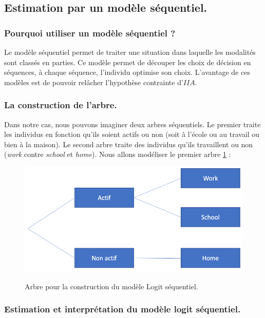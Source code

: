 \subsection{Estimation par un modèle séquentiel.}

\subsubsection*{Pourquoi utiliser un modèle séquentiel ?}

Le modèle séquentiel permet de traiter une situation dans laquelle les modalités sont classés en parties. Ce modèle permet de découper les choix de décision en séquences, à chaque séquence, l’individu optimise son choix. L’avantage de ces modèles est de pouvoir relâcher l’hypothèse contrainte d’$IIA$. 


\subsubsection*{La construction de l'arbre.}

Dans notre cas, nous pouvons imaginer deux arbres séquentiels. Le premier traite les individus en fonction qu’ils soient actifs ou non (soit à l’école ou au travail ou bien à la maison). Le second arbre traite des individus qu’ils travaillent ou non (\emph{work} contre \emph{school} et \emph{home}). Nous allons modéliser le premier arbre \ref{fig:arbre} : 


\begin{figure}[h!]
    \caption{Arbre pour la construction du modèle Logit séquentiel.}
    \includegraphics[scale = 0.7]{101_graphics/arbre.png}
    \centering
    \label{fig:arbre}
\end{figure}


\subsubsection*{Estimation et interprétation du modèle logit séquentiel.}

